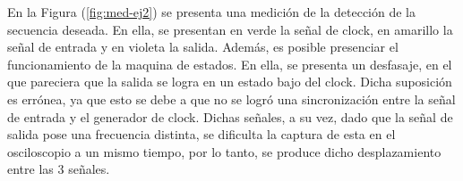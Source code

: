 En la Figura (\ref{fig:med-ej2}) se presenta una medición de la detección de la secuencia deseada. En ella, se presentan en verde la señal de clock, en amarillo la señal de entrada y en violeta la salida. Además, es posible presenciar el funcionamiento de la maquina de estados. En ella, se presenta un desfasaje, en el que pareciera que la salida se logra en un estado bajo del clock. Dicha suposición es errónea, ya que esto se debe a que no se logró una sincronización entre la señal de entrada y el generador de clock. Dichas señales, a su vez, dado que la señal de salida pose una frecuencia distinta, se dificulta la captura de esta en el osciloscopio a un mismo tiempo, por lo tanto, se produce dicho desplazamiento entre las 3 señales.